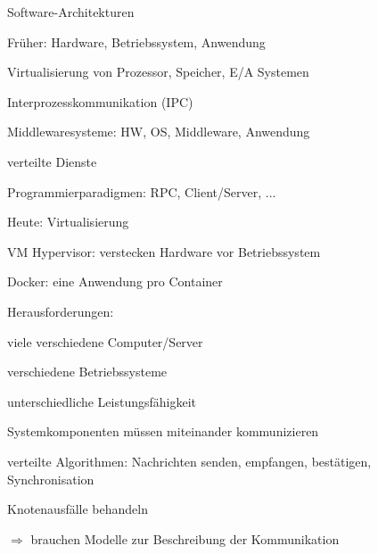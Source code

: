 \documentclass[10pt]{article}
\begin{document}
Software-Architekturen
\begin{itemize*}
  \item Früher: Hardware, Betriebssystem, Anwendung
  \begin{itemize*}
    \item Virtualisierung von Prozessor, Speicher, E/A Systemen
    \item Interprozesskommunikation (IPC)
  \end{itemize*}
  \item Middlewaresysteme: HW, OS, Middleware, Anwendung
  \begin{itemize*}
    \item verteilte Dienste
    \item Programmierparadigmen: RPC, Client/Server, ...
  \end{itemize*}
  \item Heute: Virtualisierung
  \begin{itemize*}
    \item VM Hypervisor: verstecken Hardware vor Betriebssystem
    \item Docker: eine Anwendung pro Container
  \end{itemize*}
\end{itemize*}


Herausforderungen:
\begin{itemize*}
  \item viele verschiedene Computer/Server
  \begin{itemize*}
    \item verschiedene Betriebssysteme
    \item unterschiedliche Leistungsfähigkeit
  \end{itemize*}
  \item Systemkomponenten müssen miteinander kommunizieren
  \item verteilte Algorithmen: Nachrichten senden, empfangen, bestätigen, Synchronisation
  \item Knotenausfälle behandeln
\end{itemize*}
$\Rightarrow$ brauchen Modelle zur Beschreibung der Kommunikation
\end{document}
